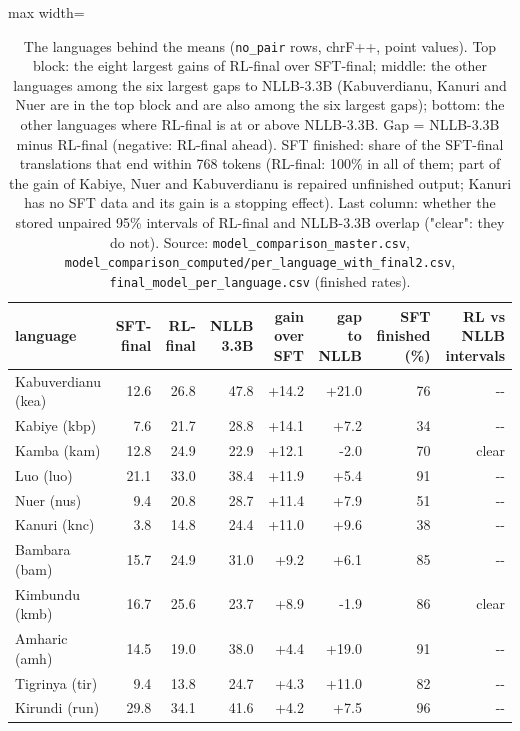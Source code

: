 \begin{table}[t]
\centering
\footnotesize
\setlength{\tabcolsep}{3pt}
\caption{The languages behind the means (\texttt{no\_pair} rows, chrF++, point values). Top block: the eight largest gains of RL-final over SFT-final; middle: the other languages among the six largest gaps to NLLB-3.3B (Kabuverdianu, Kanuri and Nuer are in the top block and are also among the six largest gaps); bottom: the other languages where RL-final is at or above NLLB-3.3B. Gap = NLLB-3.3B minus RL-final (negative: RL-final ahead). SFT finished: share of the SFT-final translations that end within 768 tokens (RL-final: 100\% in all of them; part of the gain of Kabiye, Nuer and Kabuverdianu is repaired unfinished output; Kanuri has no SFT data and its gain is a stopping effect). Last column: whether the stored unpaired 95\% intervals of RL-final and NLLB-3.3B overlap ("clear": they do not). Source: \texttt{model\_comparison\_master.csv}, \texttt{model\_comparison\_computed/per\_language\_with\_final2.csv}, \texttt{final\_model\_per\_language.csv} (finished rates).}
\label{tab:t_skew_langs}
\begin{adjustbox}{max width=\linewidth}
{\def\LTcaptype{none} %
\begin{tabular}{@{}lrrrrrrr@{}}
\toprule
language & SFT-final & RL-final & NLLB 3.3B & gain over SFT & gap to NLLB & SFT finished (\%) & RL vs NLLB intervals \\
\midrule
Kabuverdianu (kea) & 12.6 & 26.8 & 47.8 & +14.2 & +21.0 & 76 & -\/- \\
Kabiye (kbp) & 7.6 & 21.7 & 28.8 & +14.1 & +7.2 & 34 & -\/- \\
Kamba (kam) & 12.8 & 24.9 & 22.9 & +12.1 & -2.0 & 70 & clear \\
Luo (luo) & 21.1 & 33.0 & 38.4 & +11.9 & +5.4 & 91 & -\/- \\
Nuer (nus) & 9.4 & 20.8 & 28.7 & +11.4 & +7.9 & 51 & -\/- \\
Kanuri (knc) & 3.8 & 14.8 & 24.4 & +11.0 & +9.6 & 38 & -\/- \\
Bambara (bam) & 15.7 & 24.9 & 31.0 & +9.2 & +6.1 & 85 & -\/- \\
Kimbundu (kmb) & 16.7 & 25.6 & 23.7 & +8.9 & -1.9 & 86 & clear \\
Amharic (amh) & 14.5 & 19.0 & 38.0 & +4.4 & +19.0 & 91 & -\/- \\
Tigrinya (tir) & 9.4 & 13.8 & 24.7 & +4.3 & +11.0 & 82 & -\/- \\
Kirundi (run) & 29.8 & 34.1 & 41.6 & +4.2 & +7.5 & 96 & -\/- \\

\end{tabular}}
\end{adjustbox}
\end{table}
